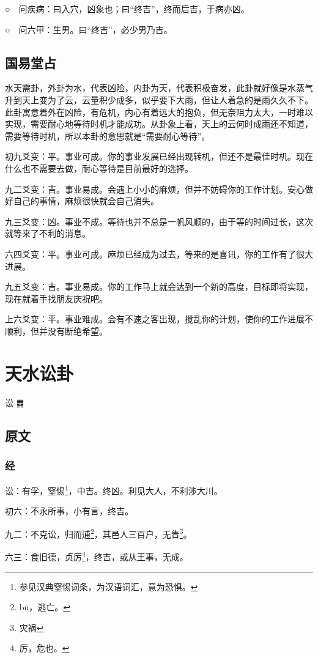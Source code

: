\documentclass[12pt,oneside]{book}
\begin{document}
○　问疾病：曰入穴，凶象也；曰“终吉”，终而后吉，于病亦凶。

○　问六甲：生男。曰“终吉”，必少男乃吉。

\section{国易堂占}
水天需卦，外卦为水，代表凶险，内卦为天，代表积极奋发，此卦就好像是水蒸气升到天上变为了云，云量积少成多，似乎要下大雨，但让人着急的是雨久久不下。此卦寓意着外在凶险，有危机，内心有着远大的抱负，但无奈阻力太大，一时难以实现，需要耐心地等待时机才能成功。从卦象上看，天上的云何时成雨还不知道，需要等待时机，所以本卦的意思就是“需要耐心等待”。

初九爻变：平。事业可成。你的事业发展已经出现转机，但还不是最佳时机。现在什么也不需要去做，耐心等待是目前最好的选择。

九二爻变：吉。事业易成。会遇上小小的麻烦，但并不妨碍你的工作计划。安心做好自己的事情，麻烦很快就会自己消失。

九三爻变：凶。事业不成。等待也并不总是一帆风顺的，由于等的时间过长，这次就等来了不利的消息。

六四爻变：平。事业可成。麻烦已经成为过去，等来的是喜讯，你的工作有了很大进展。

九五爻变：吉。事业易成。你的工作马上就会达到一个新的高度，目标即将实现，现在就着手找朋友庆祝吧。

上六爻变：平。事业难成。会有不速之客出现，搅乱你的计划，使你的工作进展不顺利，但并没有断绝希望。

\chapter{天水讼卦}
讼 {\Large ䷅}

\section{原文}
\subsection{经}
讼：有孚，窒惕\footnote{参见汉典窒惕词条，为汉语词汇，意为恐惧。}，中吉。终凶。利见大人，不利涉大川。

初六：不永所事，小有言，终吉。

九二：不克讼，归而逋\footnote{bū，逃亡。}，其邑人三百户，无眚\footnote{灾祸}。

六三：食旧德，贞厉\footnote{厉，危也。}，终吉，或从王事，无成。
\end{document}
